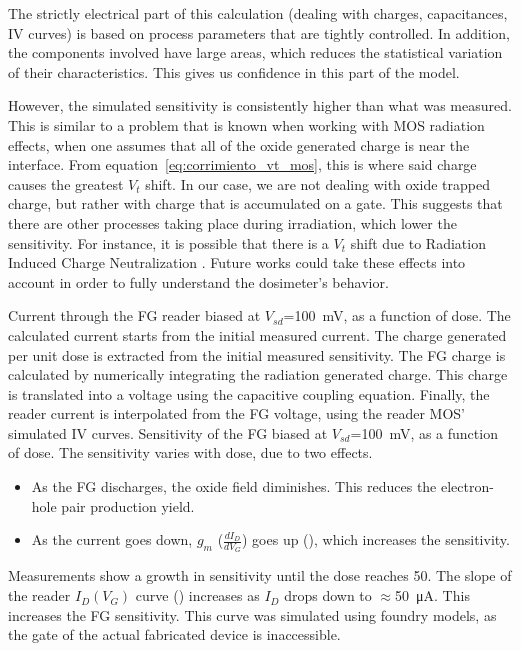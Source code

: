 The strictly electrical part of this calculation 
(dealing with charges, capacitances, IV curves)
is based on process parameters that are tightly controlled.
In addition, the components involved have large areas, which reduces the statistical variation of their characteristics.
This gives us confidence in this part of the model.

However, the simulated sensitivity is consistently higher than what was measured.
This is similar to a problem that is known when working with MOS radiation effects,
when one assumes that all of the oxide generated charge is near the interface.
From equation~\ref{eq:corrimiento_vt_mos}, this is where said charge causes the greatest $V_t$ shift.
In our case, we are not dealing with oxide trapped charge, but rather with charge that is accumulated on a gate.
This suggests that there are other processes taking place during irradiation, which lower the sensitivity.
For instance, it is possible that there is a $V_t$ shift due to Radiation Induced Charge Neutralization
\cite{faigon_extension_2008}\cite{fleetwood_radiation-induced_1990}.
Future works could take these effects into account in order to fully understand the dosimeter's behavior.

{Current through the FG reader biased at 
    $V_{sd}$=\SI{100}{\milli\volt}, as a function of dose.
The calculated current starts from the initial measured current.
The charge generated per unit dose is extracted from the initial measured sensitivity.
The FG charge is calculated by numerically integrating the radiation generated charge.
This charge is translated into a voltage using the capacitive coupling equation.
Finally, the reader current is interpolated from the FG voltage,
using the reader MOS' simulated IV curves.}
{Sensitivity of the FG biased at 
    $V_{sd}$=\SI{100}{\milli\volt}, as a function of dose.
}
The sensitivity varies with dose, due to two effects.
\begin{itemize}
    \item As the FG discharges, the oxide field diminishes.
        This reduces the electron-hole pair production yield.
    \item As the current goes down, $g_m$ ($\frac{dI_D}{dV_G}$) goes up
        (), which increases the sensitivity.
\end{itemize}
Measurements show a growth in sensitivity until the dose reaches
\SI{50}{\Gray}.
{The slope of the reader $I_D(V_G)$ curve () 
increases as $I_D$ drops down to 
$\approx$\SI{50}{\micro\ampere}.
This increases the FG sensitivity.
This curve was simulated using foundry models,
as the gate of the actual fabricated device is inaccessible.
}
